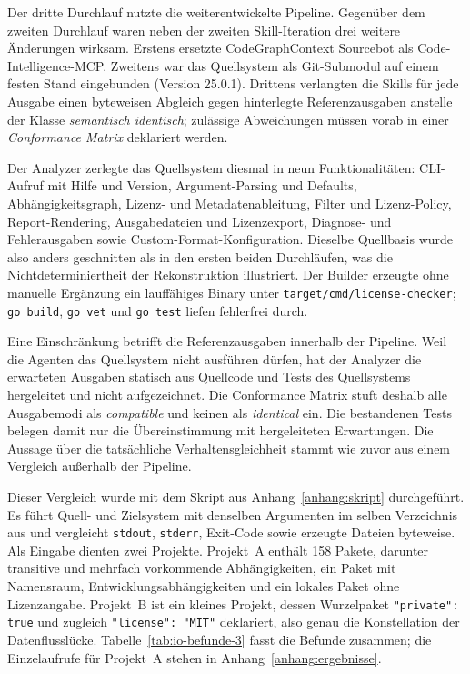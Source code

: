 Der dritte Durchlauf nutzte die weiterentwickelte Pipeline. Gegenüber dem zweiten Durchlauf waren neben der zweiten Skill-Iteration drei weitere Änderungen wirksam. Erstens ersetzte CodeGraphContext Sourcebot als Code-Intelligence-MCP. Zweitens war das Quellsystem als Git-Submodul auf einem festen Stand eingebunden (Version 25.0.1). Drittens verlangten die Skills für jede Ausgabe einen byteweisen Abgleich gegen hinterlegte Referenzausgaben anstelle der Klasse \emph{semantisch identisch}; zulässige Abweichungen müssen vorab in einer \emph{Conformance Matrix} deklariert werden.

Der Analyzer zerlegte das Quellsystem diesmal in neun Funktionalitäten: CLI-Aufruf mit Hilfe und Version, Argument-Parsing und Defaults, Abhängigkeitsgraph, Lizenz- und Metadatenableitung, Filter und Lizenz-Policy, Report-Rendering, Ausgabedateien und Lizenzexport, Diagnose- und Fehlerausgaben sowie Custom-Format-Konfiguration. Dieselbe Quellbasis wurde also anders geschnitten als in den ersten beiden Durchläufen, was die Nichtdeterminiertheit der Rekonstruktion illustriert. Der Builder erzeugte ohne manuelle Ergänzung ein lauffähiges Binary unter \texttt{target/cmd/license-checker}; \texttt{go build}, \texttt{go vet} und \texttt{go test} liefen fehlerfrei durch.

Eine Einschränkung betrifft die Referenzausgaben innerhalb der Pipeline. Weil die Agenten das Quellsystem nicht ausführen dürfen, hat der Analyzer die erwarteten Ausgaben statisch aus Quellcode und Tests des Quellsystems hergeleitet und nicht aufgezeichnet. Die Conformance Matrix stuft deshalb alle Ausgabemodi als \emph{compatible} und keinen als \emph{identical} ein. Die bestandenen Tests belegen damit nur die Übereinstimmung mit hergeleiteten Erwartungen. Die Aussage über die tatsächliche Verhaltensgleichheit stammt wie zuvor aus einem Vergleich außerhalb der Pipeline.

Dieser Vergleich wurde mit dem Skript aus Anhang~\ref{anhang:skript} durchgeführt. Es führt Quell- und Zielsystem mit denselben Argumenten im selben Verzeichnis aus und vergleicht \texttt{stdout}, \texttt{stderr}, Exit-Code sowie erzeugte Dateien byteweise. Als Eingabe dienten zwei Projekte. Projekt~A enthält 158 Pakete, darunter transitive und mehrfach vorkommende Abhängigkeiten, ein Paket mit Namensraum, Entwicklungsabhängigkeiten und ein lokales Paket ohne Lizenzangabe. Projekt~B ist ein kleines Projekt, dessen Wurzelpaket \texttt{"private": true} und zugleich \texttt{"license": "MIT"} deklariert, also genau die Konstellation der Datenflusslücke. Tabelle~\ref{tab:io-befunde-3} fasst die Befunde zusammen; die Einzelaufrufe für Projekt~A stehen in Anhang~\ref{anhang:ergebnisse}.

